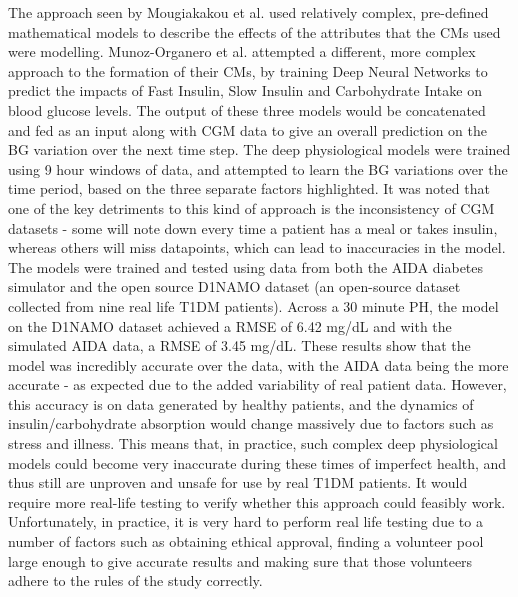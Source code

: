       The approach seen by Mougiakakou et al. \cite{paper4} used relatively complex, pre-defined mathematical models to describe the effects of the attributes that the CMs used were modelling. Munoz-Organero et al. \cite{paper6} attempted a different, more complex approach to the formation of their CMs, by training Deep Neural Networks to predict the impacts of Fast Insulin, Slow Insulin and Carbohydrate Intake on blood glucose levels. The output of these three models would be concatenated and fed as an input along with CGM data to give an overall prediction on the BG variation over the next time step. The deep physiological models were trained using 9 hour windows of data, and attempted to learn the BG variations over the time period, based on the three separate factors highlighted. It was noted that one of the key detriments to this kind of approach is the inconsistency of CGM datasets - some will note down every time a patient has a meal or takes insulin, whereas others will miss datapoints, which can lead to inaccuracies in the model. The models were trained and tested using data from both the AIDA diabetes simulator and the open source D1NAMO dataset \cite{dinamo} (an open-source dataset collected from nine real life T1DM patients). Across a 30 minute PH, the model on the D1NAMO dataset achieved a RMSE of 6.42 mg/dL and with the simulated AIDA data, a RMSE of 3.45 mg/dL. These results show that the model was incredibly accurate over the data, with the AIDA data being the more accurate - as expected due to the added variability of real patient data. However, this accuracy is on data generated by healthy patients, and the dynamics of insulin/carbohydrate absorption would change massively due to factors such as stress and illness. This means that, in practice, such complex deep physiological models could become very inaccurate during these times of imperfect health, and thus still are unproven and unsafe for use by real T1DM patients. It would require more real-life testing to verify whether this approach could feasibly work. Unfortunately, in practice, it is very hard to perform real life testing due to a number of factors such as obtaining ethical approval, finding a volunteer pool large enough to give accurate results and making sure that those volunteers adhere to the rules of the study correctly.

